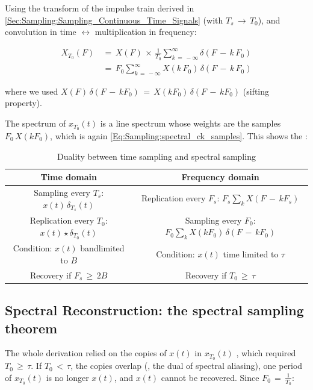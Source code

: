 Using the transform of the impulse train derived in \autoref{Sec:Sampling:Sampling_Continuous_Time_Signals} (with $T_s \, \rightarrow \, T_0$), and convolution in time $\leftrightarrow$ multiplication in frequency:

\begin{align}
X_{T_0}(F) \, &= \, X(F) \, \times \, \frac{1}{T_0} \sum_{k \, = \, -\infty}^{\infty} \delta(F \, - \, k \, F_0) \nonumber \\
&= \, F_0 \sum_{k \, = \, -\infty}^{\infty} X(k \, F_0) \, \delta(F \, - \, k \, F_0)
\label{Eq:Sampling:spectral_line_spectrum}
\end{align}

where we used $X(F) \, \delta(F \, - \, k F_0) \, = \, X(k F_0) \, \delta(F \, - \, k F_0)$ (sifting property). 

\newpage
The spectrum of $x_{T_0}(t)$ is a line spectrum whose weights are the samples $F_0 \, X(k F_0)$, which is again \autoref{Eq:Sampling:spectral_ck_samples}. This shows the :

\begin{table}[!h]
\centering
\begin{tabular}{|c|c|} \hline
Time domain & Frequency domain \\ \hline
Sampling every $T_s$: $x(t) \, \delta_{T_s}(t)$ & Replication every $F_s$: $F_s \displaystyle\sum_k X(F \, - \, k F_s)$ \\ \hline
Replication every $T_0$: $x(t) \star \delta_{T_0}(t)$ & Sampling every $F_0$: $F_0 \displaystyle\sum_k X(k F_0) \, \delta(F \, - \, k F_0)$ \\ \hline
Condition: $x(t)$ bandlimited to $B$ & Condition: $x(t)$ time limited to $\tau$ \\
Recovery if $F_s \, \geq \, 2 B$ & Recovery if $T_0 \, \geq \, \tau$ \\ \hline
\end{tabular}
\caption{Duality between time sampling and spectral sampling}
\label{Tb:Sampling:duality_time_spectral_sampling}
\end{table}

\subsection{Spectral Reconstruction: the spectral sampling theorem}

The whole derivation relied on the copies of $x(t)$ in $x_{T_0}(t)$ , which required $T_0 \, \geq \, \tau$. If $T_0 \, < \, \tau$, the copies overlap (, the dual of spectral aliasing), one period of $x_{T_0}(t)$ is no longer $x(t)$, and $x(t)$ cannot be recovered. Since $F_0 \, = \, \frac{1}{T_0}$:

